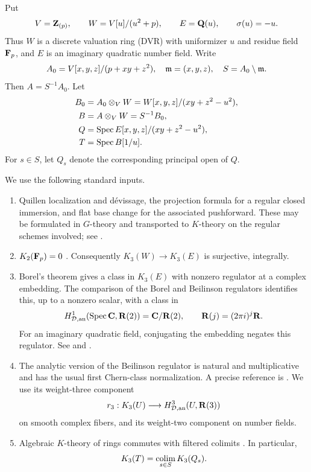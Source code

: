 Put
\[
V=\mathbf Z_{(p)},\qquad W=V[u]/(u^2+p),\qquad E=\mathbf Q(u),\qquad \sigma(u)=-u.
\]
Thus $W$ is a discrete valuation ring (DVR) with uniformizer $u$ and residue field $\mathbf F_p$, and $E$ is an imaginary quadratic number field. Write
\[
A_0=V[x,y,z]/(p+xy+z^2),\quad \mathfrak m=(x,y,z),\quad S=A_0\setminus\mathfrak m.
\]
Then $A=S^{-1}A_0$. Let
\begin{align*}
B_0&=A_0\otimes_VW=W[x,y,z]/(xy+z^2-u^2),\\
B&=A\otimes_VW=S^{-1}B_0,\\
Q&=\operatorname{Spec} E[x,y,z]/(xy+z^2-u^2),\\
T&=\operatorname{Spec} B[1/u].
\end{align*}
For $s\in S$, let $Q_s$ denote the corresponding principal open of $Q$.

We use the following standard inputs.

\begin{enumerate}
\item Quillen localization and d\'evissage, the projection formula for a regular closed immersion, and flat base change for the associated pushforward. These may be formulated in $G$-theory and transported to $K$-theory on the regular schemes involved; see \cite[Sections~5--7]{Quillen}.
\item $K_2(\mathbf F_p)=0$ \cite{QuillenFinite}\cite[IV, Corollary~1.13]{Weibel}. Consequently $K_3(W)\to K_3(E)$ is surjective, integrally.
\item Borel's theorem gives a class in $K_3(E)$ with nonzero regulator at a complex embedding. The comparison of the Borel and Beilinson regulators identifies this, up to a nonzero scalar, with a class in
\[
H_{\mathcal D,\mathrm{an}}^1(\operatorname{Spec}\mathbf C,\mathbf R(2))=\mathbf C/\mathbf R(2),\qquad \mathbf R(j)=(2\pi i)^j\mathbf R.
\]
For an imaginary quadratic field, conjugating the embedding negates this regulator. See \cite[Proposition~12.2]{Borel} and \cite[Section~6]{BunkeTamme}.
\item The analytic version of the Beilinson regulator is natural and multiplicative and has the usual first Chern-class normalization. A precise reference is \cite[Theorem~2.31]{BunkeTamme}. We use its weight-three component
\[
r_3:K_3(U)\longrightarrow H_{\mathcal D,\mathrm{an}}^3(U,\mathbf R(3))
\]
on smooth complex fibers, and its weight-two component on number fields.
\item Algebraic $K$-theory of rings commutes with filtered colimits \cite[IV, Section~6.4]{Weibel}. In particular,
\begin{equation}\label{d3:eq:continuity}
K_3(T)=\operatorname*{colim}_{s\in S} K_3(Q_s).
\end{equation}
\end{enumerate}

